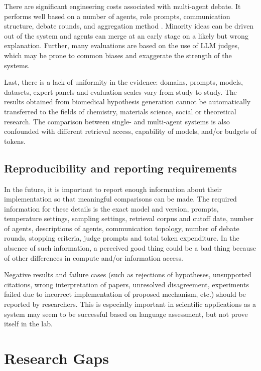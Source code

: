 \documentclass[acmsmall,screen,review]{acmart}
\begin{document}
There are significant engineering costs associated with multi-agent debate. It performs well based on a number of agents, role prompts, communication structure, debate rounds, and aggregation method \cite{smit2024mad}. Minority ideas can be driven out of the system and agents can merge at an early stage on a likely but wrong explanation. Further, many evaluations are based on the use of LLM judges, which may be prone to common biases and exaggerate the strength of the systems.

Last, there is a lack of uniformity in the evidence: domains, prompts, models, datasets, expert panels and evaluation scales vary from study to study. The results obtained from biomedical hypothesis generation cannot be automatically transferred to the fields of chemistry, materials science, social or theoretical research. The comparison between single- and multi-agent systems is also confounded with different retrieval access, capability of models, and/or budgets of tokens.


\subsection{Reproducibility and reporting requirements}
\label{subsec:reproducibility}

In the future, it is important to report enough information about their implementation so that meaningful comparisons can be made. The required information for these details is the exact model and version, prompts, temperature settings, sampling settings, retrieval corpus and cutoff date, number of agents, descriptions of agents, communication topology, number of debate rounds, stopping criteria, judge prompts and total token expenditure. In the absence of such information, a perceived good thing could be a bad thing because of other differences in compute and/or information access.

Negative results and failure cases (such as rejections of hypotheses, unsupported citations, wrong interpretation of papers, unresolved disagreement, experiments failed due to incorrect implementation of proposed mechanism, etc.) should be reported by researchers. This is especially important in scientific applications as a system may seem to be successful based on language assessment, but not prove itself in the lab.


\section{Research Gaps}
\label{sec:research-gaps}
\end{document}

